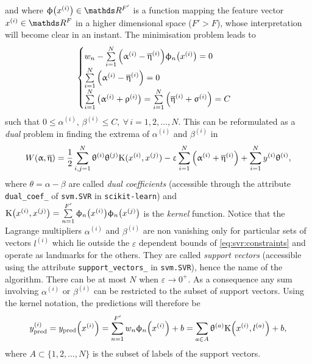 and where $\phi\qty(x^{(i)}) \in \R^{F'}$ is a function mapping the feature vector $x^{(i)} \in \R^F$ in a higher dimensional space ($F' > F$), whose interpretation will become clear in an instant.
The minimisation problem leads to
\begin{equation}
  \begin{cases}
    w_n - \sum\limits_{i = 1}^{N} \qty( \upalpha^{(i)} - \overline{\upeta}^{(i)} ) \upphi_n\qty(x^{(i)}) = 0
    \\
    \sum\limits_{i = 1}^{N} \qty( \upalpha^{(i)} - \overline{\upeta}^{(i)} ) = 0
    \\
    \sum\limits_{i = 1}^{N} \qty( \upalpha^{(i)} + \uprho^{(i)} )
    =
    \sum\limits_{i = 1}^{N} \qty( \overline{\upeta}^{(i)} + \upsigma^{(i)} )
    =
    C
  \end{cases}
\end{equation}
such that $0 \le \alpha^{(i)},\, \beta^{(i)} \le C,~\forall\, i = 1, 2, \dots, N$. This can be reformulated as a \textit{dual} problem in finding the extrema of $\alpha^{(i)}$ and $\beta^{(i)}$ in
\begin{equation}
  W(\upalpha, \overline{\upeta})
  =
  \frac{1}{2} \sum\limits_{i, j = 1}^N \uptheta^{(i)} \uptheta^{(j)} \mathrm{K}( x^{(i)}, x^{(j)} )
  -
  \upvarepsilon \sum\limits_{i = 1}^{N} \qty( \upalpha^{(i)} + \overline{\upeta}^{(i)} )
  +
  \sum\limits_{i = 1}^{N} y^{(i)} \uptheta^{(i)},
  \label{eq:svr:loss-v2}
\end{equation}
where $\theta = \alpha - \beta$ are called \textit{dual coefficients} (accessible through the attribute \texttt{dual\_coef\_} of \texttt{svm.SVR} in \texttt{scikit-learn}) and $\mathrm{K}\qty( x^{(i)}, x^{(j)} ) = \sum\limits_{n = 1}^{F'} \upphi_n\qty(x^{(i)}) \upphi_n\qty( x^{(j)} )$ is the \textit{kernel} function.
Notice that the Lagrange multipliers $\alpha^{(i)}$ and $\beta^{(i)}$ are non vanishing only for particular sets of vectors $l^{(i)}$ which lie outside the $\varepsilon$ dependent bounds of \eqref{eq:svr:constraints} and operate as landmarks for the others.
They are called \textit{support vectors} (accessible using the attribute \texttt{support\_vectors\_} in \texttt{svm.SVR}), hence the name of the algorithm. There can be at most $N$ when $\varepsilon \to 0^+$.
As a consequence any sum involving $\alpha^{(i)}$ or $\beta^{(i)}$ can be restricted to the subset of support vectors.
Using the kernel notation, the predictions will therefore be
\begin{equation}
  y_{\text{pred}}^{(i)}
  =
  y_{\text{pred}}\qty(x^{(i)})
  =
  \sum\limits_{n = 1}^{F'} w_n \upphi_n\qty(x^{(i)}) + b
  =
  \sum\limits_{a \in A} \uptheta^{(a)} \mathrm{K}\qty( x^{(i)}, l^{(a)} ) + b,
\end{equation}
where $A \subset \lbrace 1, 2, \dots, N \rbrace$ is the subset of labels of the support vectors.


